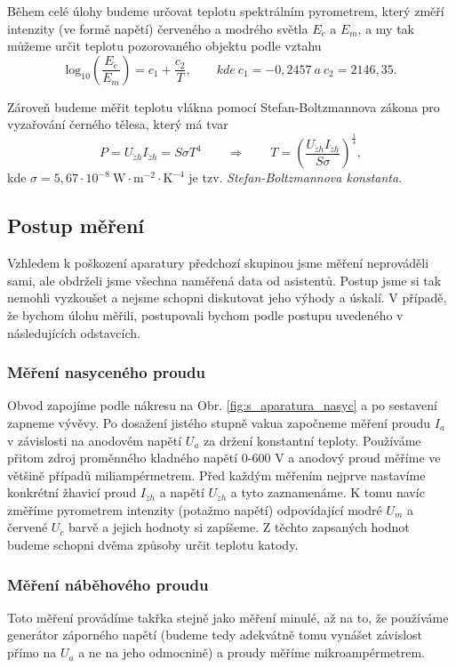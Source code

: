 \documentclass[english]{article}
\begin{document}
		Během celé úlohy budeme určovat teplotu spektrálním pyrometrem, který změří intenzity (ve formě napětí) červeného a modrého světla $E_{\check{c}}$ a $E_m$, a my tak můžeme určit teplotu pozorovaného objektu podle vztahu
		\begin{equation}
			\mathrm{log_{10}}\left(\frac{E_{\check{c}}}{E_m}\right) = c_1+\frac{c_2}{T},\qquad kde~c_1 = -0,2457~a~c_2 = 2146,35.
			\label{eq:pyro}
		\end{equation}
		
		Zároveň budeme měřit teplotu vlákna pomocí Stefan-Boltzmannova zákona pro vyzařování černého tělesa, který má tvar 
		\begin{equation}
			P = U_{\check{z}h}I_{\check{z}h} = S\sigma T^4 \qquad \Rightarrow \qquad T=\left(\frac{U_{\check{z}h}I_{\check{z}h}}{S\sigma}\right)^\frac{1}{4},
			\label{eq:stefan}
		\end{equation}
		kde $\sigma=5,67\cdot10^{-8}~\mathrm{W\cdot m^{-2}\cdot K^{-4}}$ je tzv. \emph{Stefan-Boltzmannova konstanta}.
		
	\subsection{Postup měření}
		Vzhledem k poškození aparatury předchozí skupinou jsme měření neprováděli sami, ale obdrželi jsme všechna naměřená data od asistentů. Postup jsme si tak nemohli vyzkoušet a nejsme schopni diskutovat jeho výhody a úskalí. V případě, že bychom úlohu měřili, postupovali bychom podle postupu uvedeného v následujících odstavcích.
		
		\subsubsection{Měření nasyceného proudu}
			Obvod zapojíme podle nákresu na Obr. \ref{fig:s_aparatura_nasyc} a po sestavení zapneme vývěvy. Po dosažení jistého stupně vakua započneme měření proudu $I_a$ v závislosti na anodovém napětí $U_a$ za držení konstantní teploty. Používáme přitom zdroj proměnného kladného napětí 0-600 V a anodový proud měříme ve většině případů miliampérmetrem. Před každým měřením nejprve nastavíme konkrétní žhavicí proud $I_{\check{z}h}$ a napětí $U_{\check{z}h}$ a tyto zaznamenáme. K tomu navíc změříme pyrometrem intenzity (potažmo napětí) odpovídající modré $U_m$ a červené $U_{\check{c}}$ barvě a jejich hodnoty si zapíšeme. Z těchto zapsaných hodnot budeme schopni dvěma způsoby určit teplotu katody.   
			
		\subsubsection{Měření náběhového proudu}
			Toto měření provádíme takřka stejně jako měření minulé, až na to, že používáme generátor záporného napětí (budeme tedy adekvátně tomu vynášet závislost přímo na $U_a$ a ne na jeho odmocnině) a proudy měříme mikroampérmetrem.
			
\end{document}
